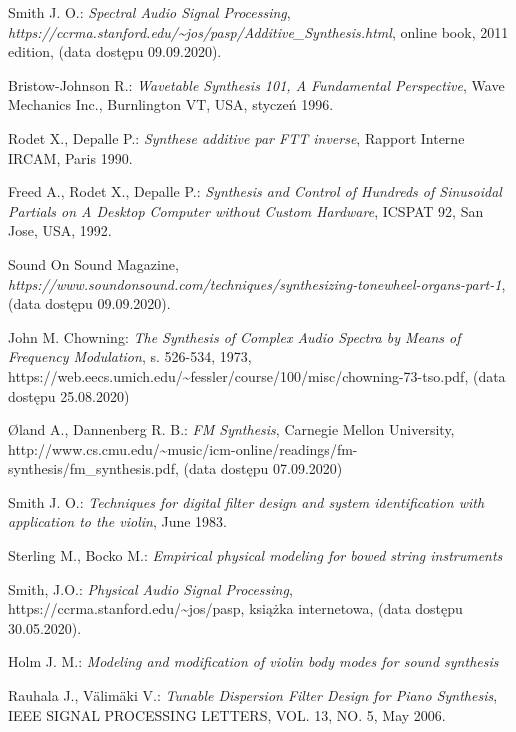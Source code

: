 \documentclass[nostrict]{szablonPG}
\begin{document}
\begin{thebibliography}{20}
		Smith J. O.: \emph{Spectral Audio Signal Processing}, \emph{https://ccrma.stanford.edu/\textasciitilde jos/pasp/Additive\_Synthesis.html}, online book, 2011 edition, (data dostępu 09.09.2020).
		
		Bristow-Johnson R.: \emph{Wavetable Synthesis 101, A Fundamental Perspective}, Wave Mechanics Inc., Burnlington VT, USA, styczeń 1996.
		
		Rodet X., Depalle P.: \emph{Synthese additive par FTT inverse}, Rapport Interne IRCAM, Paris 1990.
		
		Freed A., Rodet X., Depalle P.: \emph{Synthesis and Control of Hundreds of Sinusoidal Partials on A Desktop Computer without Custom Hardware}, ICSPAT 92, San Jose, USA, 1992.
		
		Sound On Sound Magazine, \emph{https://www.soundonsound.com/techniques/synthesizing-tonewheel-organs-part-1}, (data dostępu 09.09.2020).
		
		John M. Chowning: \emph{The Synthesis of Complex Audio Spectra by Means of Frequency Modulation}, s. 526-534, 1973, https://web.eecs.umich.edu/\textasciitilde fessler/course/100/misc/chowning-73-tso.pdf, (data dostępu 25.08.2020)
		
		Øland A., Dannenberg R. B.: \emph{FM Synthesis}, Carnegie Mellon University, http://www.cs.cmu.edu/\textasciitilde music/icm-online/readings/fm-synthesis/fm\_synthesis.pdf, (data dostępu 07.09.2020)
		
		Smith J. O.: \emph{Techniques for digital filter design and system identification with application to the violin}, June 1983.
		
		Sterling M., Bocko M.: \emph{Empirical physical modeling for bowed string instruments}
		
		Smith, J.O.: \emph{Physical Audio Signal Processing}, https://ccrma.stanford.edu/\textasciitilde jos/pasp, książka internetowa, (data dostępu 30.05.2020).
		
		Holm J. M.: \emph{Modeling and modification of violin body modes for sound synthesis}
			
		Rauhala J., Välimäki V.: \emph{Tunable Dispersion Filter Design for Piano Synthesis}, IEEE SIGNAL PROCESSING LETTERS, VOL. 13, NO. 5, May 2006.
		

\end{thebibliography}
\end{document}

